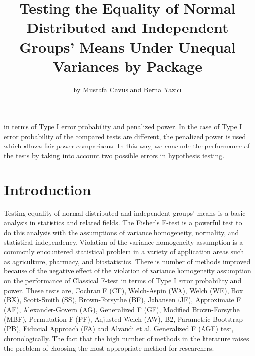 \title{Testing the Equality of Normal Distributed and Independent Groups' Means Under Unequal Variances by  Package}
\author{by Mustafa Cavus and Berna Yazıcı}

\maketitle
 in terms of Type I error probability and penalized power. In the case of Type I error probability of the compared tests are different, the penalized power is used which allows fair power comparisons. In this way, we conclude the performance of the tests by taking into account two possible errors in hypothesis testing.
\section{Introduction}

Testing equality of normal distributed and independent groups' means is a basic analysis in statistics and related fields. The Fisher's F-test is a powerful test to do this analysis with the assumptions of variance homogeneity, normality, and statistical independency. Violation of the variance homogeneity assumption is a commonly encountered statistical problem in a variety of application areas such as agriculture, pharmacy, and biostatistics. There is number of methods improved because of the negative effect of the violation of variance homogeneity assumption on the performance of Classical F-test in terms of Type I error probability and power. These tests are, Cochran F (CF), Welch-Aspin (WA), Welch (WE), Box (BX), Scott-Smith (SS), Brown-Forsythe (BF), Johansen (JF), Approximate F (AF), Alexander-Govern (AG), Generalized F (GF), Modified Brown-Forsythe (MBF), Permutation F (PF), Adjusted Welch (AW), B2, Parametric Bootstrap (PB), Fiducial Approach (FA) and Alvandi et al. Generalized F (AGF) test, chronologically. The fact that the high number of methods in the literature raises the problem of choosing the most appropriate method for researchers. 

